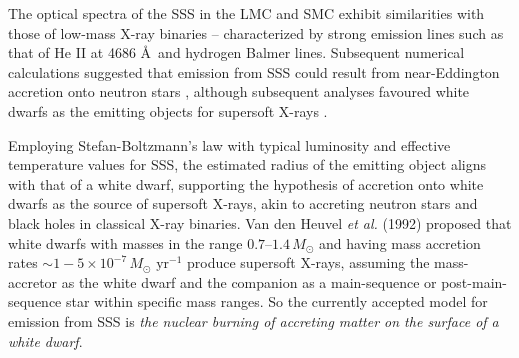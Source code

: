     
    The optical spectra of the SSS in the LMC and SMC exhibit similarities with those of low-mass X-ray binaries -- characterized by strong emission lines such as that of He II at 4686 \AA\ and hydrogen Balmer lines. Subsequent numerical calculations suggested that emission from SSS could result from near-Eddington accretion onto neutron stars \cite{kylafis93}, although subsequent analyses favoured white dwarfs as the emitting objects for supersoft X-rays \cite{vandenHeuvel92}.
    
    Employing Stefan-Boltzmann's law with typical luminosity and effective temperature values for SSS, the estimated radius of the emitting object aligns with that of a white dwarf, supporting the hypothesis of accretion onto white dwarfs as the source of supersoft X-rays, akin to accreting neutron stars and black holes in classical X-ray binaries. Van den Heuvel \textit{et al.} (1992) \cite{van1992accreting} proposed that white dwarfs with masses in the range $0.7–1.4\,M_\odot$ and having mass accretion rates $\sim 1-5\times 10^{-7}\,M_\odot\text{ yr}^{-1}$ produce supersoft X-rays, assuming the mass-accretor as the white dwarf and the companion as a main-sequence or post-main-sequence star within specific mass ranges. %
    So the currently accepted model for emission from SSS is \textit{the nuclear burning of accreting matter on the surface of a white dwarf}.
    
